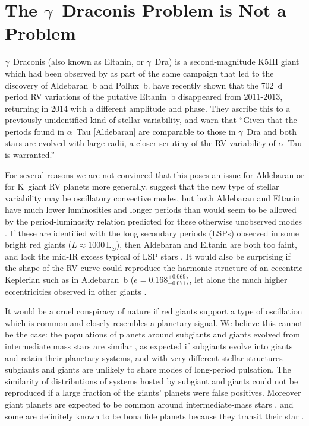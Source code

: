 \documentclass[modern]{aastex61}
\newcommand{\lsun}{\mbox{$\mathrm{L}_{\odot}$}\xspace}
\newcommand{\twosidedrange}[3]{\ensuremath{#1^{+#2}_{-#3}}}
\newcommand{\EccentricityRange}{\twosidedrange{0.168}{0.069}{0.071}}
\begin{document}
\section{The $\gamma$~Draconis Problem is Not a Problem}
\label{gamma_dra}

$\gamma$~Draconis (also known as Eltanin, or $\gamma$~Dra) is a second-magnitude K5III giant which had been observed by \citet{hatzes1993} as part of the same campaign that led to the discovery of Aldebaran~b and Pollux~b. \citet{2018arXiv180105239H} have recently shown that the 702~d period RV variations of the putative Eltanin~b disappeared from 2011-2013, returning in 2014 with a different amplitude and phase. They ascribe this to a previously-unidentified kind of stellar variability, and warn that ``Given that the periods found in $\alpha$~Tau [Aldebaran] are comparable to those in $\gamma$~Dra and both stars are evolved with large radii, a closer scrutiny of the RV variability of $\alpha$~Tau is warranted.''

For several reasons we are not convinced that this poses an issue for Aldebaran or for K~giant RV planets more generally. \citet{2018arXiv180105239H} suggest that the new type of stellar variability may be oscillatory convective modes, but both Aldebaran and Eltanin have much lower luminosities and longer periods than would seem to be allowed by the period-luminosity relation predicted for these otherwise unobserved modes \citep[Figure~9]{2015MNRAS.452.3863S,2018arXiv180105239H}. If these are identified with the long secondary periods (LSPs) observed in some bright red giants ($L \approx 1000\, \lsun$), then Aldebaran and Eltanin are both too faint, and lack the mid-IR excess typical of LSP stars \citep{2009ApJ...707..573W}. It would also be surprising if the shape of the RV curve could reproduce the harmonic structure of an eccentric Keplerian such as in Aldebaran~b ($e = \EccentricityRange{}$), let alone the much higher eccentricities observed in other giants \citep[e.g. $\iota$~Dra~b, $e=0.7$:][]{2002ApJ...576..478F}.

It would be a cruel conspiracy of nature if red giants support a type of oscillation which is common and closely resembles a planetary signal. We believe this cannot be the case: the populations of planets around subgiants and giants evolved from intermediate mass stars are similar \citep{2014A&A...566A.113J}, as expected if subgiants evolve into giants and retain their planetary systems, and with very different stellar structures subgiants and giants are unlikely to share modes of long-period pulsation. The similarity of distributions of systems hosted by subgiant and giants could not be reproduced if a large fraction of the giants' planets were false positives. Moreover giant planets are expected to be common around intermediate-mass stars \citep{2008ApJ...673..502K}, and some are definitely known to be bona fide planets because they transit their star \citep[e.g.][]{2014A&A...562A.109L,2015A&A...573L...6O,2016AJ....152..185G,2017AJ....154..254G}.
\end{document}
